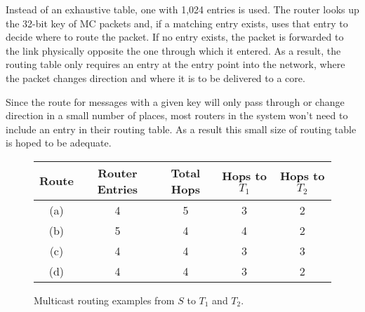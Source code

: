 				Instead of an exhaustive table, one with 1,024 entries is used. The
				router looks up the 32-bit key of MC packets and, if a matching entry
				exists, uses that entry to decide where to route the packet. If no entry
				exists, the packet is forwarded to the link physically opposite the one
				through which it entered. As a result, the routing table only requires
				an entry at the entry point into the network, where the packet changes
				direction and where it is to be delivered to a core.
				
				Since the route for messages with a given key will only pass through or
				change direction in a small number of places, most routers in the system
				won't need to include an entry in their routing table. As a result this
				small size of routing table is hoped to be adequate.
				
				\begin{figure}[t!]
					\begin{subfigure}[b]{0.24\textwidth}
						\center
						
						\caption{}
						\label{fig:multicast-routing-a}
					\end{subfigure}
					\begin{subfigure}[b]{0.24\textwidth}
						\center
						
						\caption{}
						\label{fig:multicast-routing-b}
					\end{subfigure}
					\begin{subfigure}[b]{0.24\textwidth}
						\center
						
						\caption{}
						\label{fig:multicast-routing-c}
					\end{subfigure}
					\begin{subfigure}[b]{0.24\textwidth}
						\center
						
						\caption{}
						\label{fig:multicast-routing-d}
					\end{subfigure}
					
					\center
					\begin{tabular}{c c c c c}
						\toprule
							Route & Router Entries & Total Hops & Hops to $T_1$ & Hops to $T_2$ \\
						\midrule
							(a)   & 4              & 5          & 3             & 2             \\
							(b)   & 5              & 4          & 4             & 2             \\
							(c)   & 4              & 4          & 3             & 3             \\
							(d)   & 4              & 4          & 3             & 2             \\
						\bottomrule
					\end{tabular}
					
					\caption[Multicast routing examples.]{Multicast routing examples from
					$S$ to $T_1$ and $T_2$.}
					\label{fig:multicast-routing}
				\end{figure}
				

